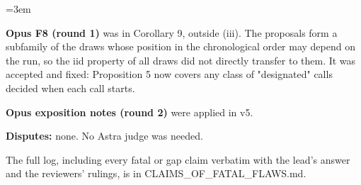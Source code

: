 \documentclass[11pt]{report}
\newenvironment{mdblock}{\begingroup\mdfont\raggedright\setlength{\parindent}{0pt}\setlength{\parskip}{0.55em}\emergencystretch=3em}{\par\endgroup}
\begin{document}
\begin{mdblock}
\begin{mdbul}
\item \textbf{Opus F8 (round 1)} was in Corollary 9, outside (iii). The proposals form a subfamily of the draws whose position in the chronological order may depend on the run, so the iid property of all draws did not directly transfer to them. It was accepted and fixed: Proposition 5 now covers any class of "designated" calls decided when each call starts.
\item \textbf{Opus exposition notes (round 2)} were applied in v5.
\end{mdbul}

\textbf{Disputes:} none. No Astra judge was needed.

The full log, including every fatal or gap claim verbatim with the lead's answer and the reviewers' rulings, is in {\mdtt CLAIMS\_\allowbreak{}OF\_\allowbreak{}FATAL\_\allowbreak{}FLAWS.\allowbreak{}md}.
\end{mdblock}
\end{document}
